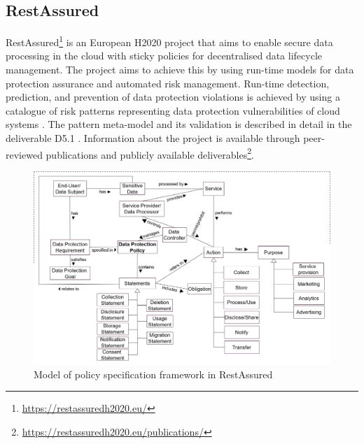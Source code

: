 \subsection{RestAssured}
RestAssured\footnote{\url{https://restassuredh2020.eu/}} is an European H2020 project that aims to enable secure data processing in the cloud with sticky policies for decentralised data lifecycle management.
The project aims to achieve this by using run-time models for data protection assurance and automated risk management. Run-time detection, prediction, and prevention of data protection violations is achieved by using a catalogue of risk patterns representing data protection vulnerabilities of cloud systems \cite{palm_modelling_2018,braubach_using_2018}. The pattern meta-model and its validation is described in detail in the deliverable D5.1 \cite{noauthor_d5.1.pdf_nodate}. Information about the project is available through peer-reviewed publications and publicly available deliverables\footnote{\url{https://restassuredh2020.eu/publications/}}.
\begin{figure}[htbp]
    \centering
    \includegraphics[width=\linewidth]{img/RestAssured_model.png}
    \caption{Model of policy specification framework in RestAssured \cite{noauthor_d6.1.pdf_nodate}}
    \label{fig:RestAssured-model}
\end{figure}


